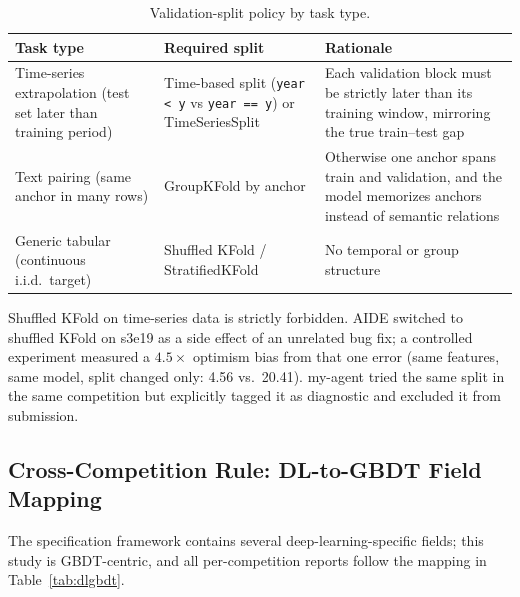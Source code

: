 \documentclass[11pt,a4paper]{article}
\begin{document}
\begin{table}[H]
\centering\small
\caption{Validation-split policy by task type.}
\label{tab:splits}
\begin{tabular}{@{}L{4.2cm}L{4.4cm}L{6.0cm}@{}}
\toprule
\textbf{Task type} & \textbf{Required split} & \textbf{Rationale} \\
\midrule
Time-series extrapolation (test set later than training period) & Time-based split (\texttt{year < y} vs \texttt{year == y}) or TimeSeriesSplit & Each validation block must be strictly later than its training window, mirroring the true train--test gap \\
Text pairing (same anchor in many rows) & GroupKFold by anchor & Otherwise one anchor spans train and validation, and the model memorizes anchors instead of semantic relations \\
Generic tabular (continuous i.i.d.\ target) & Shuffled KFold / StratifiedKFold & No temporal or group structure \\
\bottomrule
\end{tabular}
\end{table}

Shuffled KFold on time-series data is strictly forbidden. AIDE switched to shuffled KFold on s3e19 as a side effect of an unrelated bug fix; a controlled experiment measured a $4.5\times$ optimism bias from that one error (same features, same model, split changed only: 4.56 vs.\ 20.41). my-agent tried the same split in the same competition but explicitly tagged it as diagnostic and excluded it from submission.

\subsection{Cross-Competition Rule: DL-to-GBDT Field Mapping}

The specification framework contains several deep-learning-specific fields; this study is GBDT-centric, and all per-competition reports follow the mapping in Table~\ref{tab:dlgbdt}.
\end{document}
